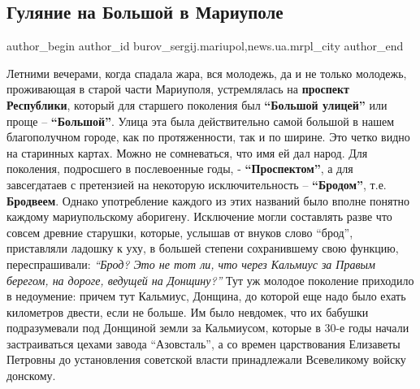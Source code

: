  
 
 
 
 
 
\subsection{Гуляние на Большой в Мариуполе}
\label{sec:25_05_2019.stz.news.ua.mrpl_city.1.guljanie_na_bolshoj_v_mariupole}
 
\ifcmt
 author_begin
   author_id burov_sergij.mariupol,news.ua.mrpl_city
 author_end
\fi


Летними вечерами, когда спадала жара, вся молодежь, да и не только молодежь,
проживающая в старой части Мариуполя, устремлялась на \textbf{проспект Республики},
который для старшего поколения был \textbf{\enquote{Большой улицей}} или проще – \textbf{\enquote{Большой}}.
Улица эта была действительно самой большой в нашем благополучном городе, как по
протяженности, так и по ширине. Это четко видно на старинных картах. Можно не
сомневаться, что имя ей дал народ. Для поколения, подросшего в послевоенные
годы, - \textbf{\enquote{Проспектом}}, а для завсегдатаев с претензией на некоторую
исключительность – \textbf{\enquote{Бродом}}, т.е. \textbf{Бродвеем}. Однако употребление каждого из этих
названий было вполне понятно каждому мариупольскому аборигену. Исключение могли
составлять разве что совсем древние старушки, которые, услышав от внуков слово
\enquote{брод}, приставляли ладошку к уху, в большей степени сохранившему свою функцию,
переспрашивали: \emph{\enquote{Брод? Это не тот ли, что через Кальмиус за Правым берегом, на
дороге, ведущей на Донщину?}} Тут уж молодое поколение приходило в недоумение:
причем тут Кальмиус, Донщина, до которой еще надо было ехать километров двести,
если не больше. Им было невдомек, что их бабушки подразумевали под Донщиной
земли за Кальмиусом, которые в 30-е годы начали застраиваться цехами завода
\enquote{Азовсталь}, а со времен царствования Елизаветы Петровны до установления
советской власти принадлежали Всевеликому войску донскому.

